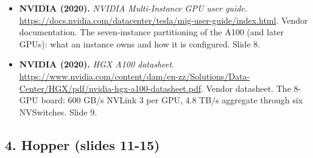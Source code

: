 \documentclass[11pt,letterpaper]{article}
\begin{document}
\begin{itemize}[leftmargin=1.2em,itemsep=3pt]
\item \textbf{NVIDIA (2020).} \textit{NVIDIA Multi-Instance GPU user guide}. \url{https://docs.nvidia.com/datacenter/tesla/mig-user-guide/index.html}. Vendor documentation. The seven-instance partitioning of the A100 (and later GPUs): what an instance owns and how it is configured. Slide 8.
\item \textbf{NVIDIA (2020).} \textit{HGX A100 datasheet}. \url{https://www.nvidia.com/content/dam/en-zz/Solutions/Data-Center/HGX/pdf/nvidia-hgx-a100-datasheet.pdf}. Vendor datasheet. The 8-GPU board: 600 GB/s NVLink 3 per GPU, 4.8 TB/s aggregate through six NVSwitches. Slide 9.
\end{itemize}
\subsection*{4. Hopper (slides 11-15)}
\end{document}

